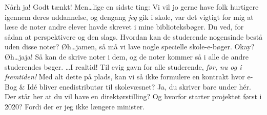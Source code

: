 \documentclass[a4paper,11pt]{article}
\begin{document}
\begin{sketch}
     Nårh ja! Godt tænkt! Men\ldots lige en sidste ting: Vi vil jo gerne have
             folk hurtigere igennem deres uddannelse, og dengang \emph{jeg} gik i skole,
             var det vigtigt for mig at læse de noter andre elever havde skrevet i mine
             biblioteksbøger. Du ved, for sådan at perspektivere og den slags.
             Hvordan kan de studerende nogensinde bestå uden disse noter?
      Øh\ldots jamen, så må vi lave nogle specielle skole-e-bøger.
     Okay?
     Øh\ldots jaja! Så kan de skrive noter i dem, og de noter kommer så i alle
             de andre studerendes bøger. \ldots I realtid!
     Til evig gavn for alle studerende, \emph{før, nu og i fremtiden!}
     Med alt dette på plads, kan vi så ikke formulere en kontrakt hvor e-Bog \& Idé bliver enedistributør til skolevæsnet?
      Ja, du skriver bare under hér.
     Der står her at du vil have en direktørstilling? Og hvorfor starter projektet først i 2020?
      Fordi der er jeg ikke længere minister.

\end{sketch}
\end{document}
